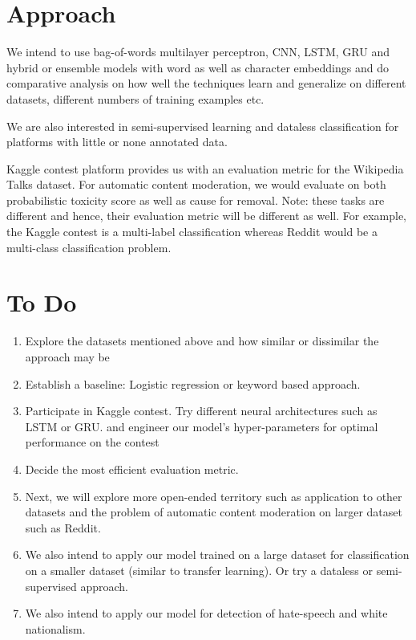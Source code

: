 \documentclass[11pt,letterpaper]{article}
\newcommand{\blue}[1]{\textcolor{RoyalBlue}{#1}}
\newcommand{\instructions}[1]{\blue{\textit{#1}}}
\renewcommand{\instructions}[1]{}
\begin{document}
\section*{Approach}
\instructions{Describe how you want to tackle this task}
We intend to use bag-of-words multilayer perceptron, CNN, LSTM, GRU and hybrid or ensemble models with word as well as character embeddings and do comparative analysis on how well the techniques learn and generalize on different datasets, different numbers of training examples etc.

We are also interested in semi-supervised learning and dataless classification for platforms with little or none annotated data.

Kaggle contest platform provides us with an evaluation metric for the Wikipedia Talks dataset. For automatic content moderation, we would evaluate on both probabilistic toxicity score as well as cause for removal. Note: these tasks are different and hence, their evaluation metric will be different as well. For example, the Kaggle contest is a multi-label classification whereas Reddit would be a multi-class classification problem.

\section*{To Do}
\instructions{Get started by making a to-do list. If you have a group
  project: who will do what? Set yourself deadlines. Here are a few
  items that might appear on your to-do list}
\begin{enumerate}

\item Explore the datasets mentioned above and how similar or dissimilar the approach may be
\item Establish a baseline: Logistic regression or keyword based approach.
\item Participate in Kaggle contest. Try different neural  architectures such as LSTM or GRU. and engineer our model’s hyper-parameters for optimal performance on the contest
\item Decide the most efficient evaluation metric.
\item Next, we will explore more open-ended territory such as application to other datasets and the problem of automatic content moderation on larger dataset such as Reddit.
\item We also intend to apply our model trained on a large dataset for classification on a smaller dataset (similar to transfer learning). Or try a dataless or semi-supervised approach.
\item We also intend to apply our model for detection of hate-speech and white nationalism.
\end{enumerate}
\end{document}

